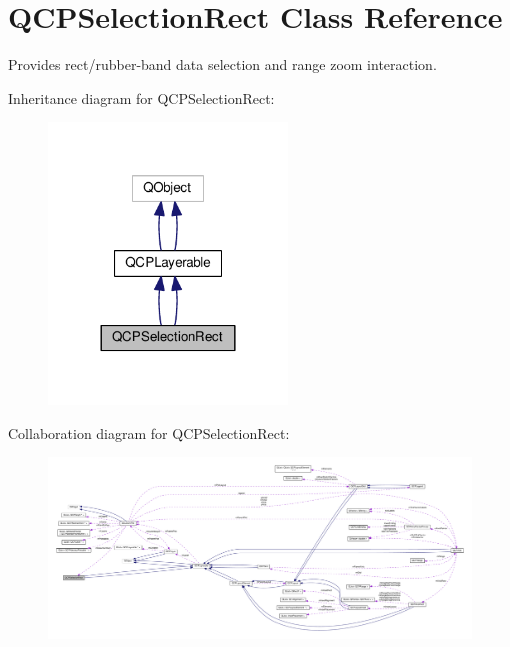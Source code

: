 \hypertarget{class_q_c_p_selection_rect}{}\section{Q\+C\+P\+Selection\+Rect Class Reference}
\label{class_q_c_p_selection_rect}


Provides rect/rubber-\/band data selection and range zoom interaction.  




Inheritance diagram for Q\+C\+P\+Selection\+Rect\+:\nopagebreak
\begin{figure}[H]
\begin{center}
\leavevmode
\includegraphics[width=180pt]{class_q_c_p_selection_rect__inherit__graph}
\end{center}
\end{figure}


Collaboration diagram for Q\+C\+P\+Selection\+Rect\+:\nopagebreak
\begin{figure}[H]
\begin{center}
\leavevmode
\includegraphics[width=350pt]{class_q_c_p_selection_rect__coll__graph}
\end{center}
\end{figure}
